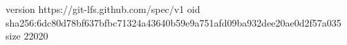 version https://git-lfs.github.com/spec/v1
oid sha256:6dc80d78bf637bfbc71324a43640b59e9a751afd09ba932dee20ae0d2f57a035
size 22020
